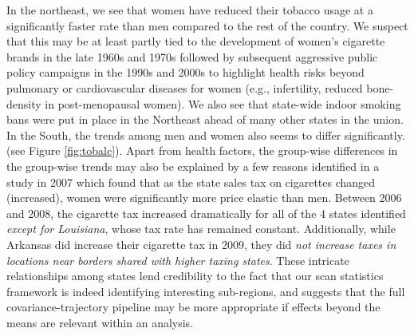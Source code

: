In the northeast, we see that women have reduced their tobacco usage at a significantly faster rate than men compared to the rest of the country. 
We suspect that this may be at least partly tied to the development of women's cigarette brands in the late 1960s and 1970s 
followed by subsequent aggressive public policy campaigns in the 1990s and 2000s to highlight health risks beyond 
pulmonary or cardiovascular diseases for women (e.g., infertility, reduced bone-density in post-menopausal women). We also see that 
state-wide indoor smoking bans were put in place in the Northeast 
ahead of many other states in the union.  
In the South, the trends among men and women also seems to differ significantly. (see Figure \ref{fig:tobalc}). 
Apart from health factors, the group-wise differences in the group-wise trends may also be explained by 
a few reasons identified in a study in 2007 \citep{HEC:HEC1223} which found that as the state sales tax on cigarettes changed (increased), 
women were significantly more price elastic than men. Between 2006 and 2008, the cigarette tax increased dramatically for all of the 4 states identified \textit{except for Louisiana}, whose tax rate has remained constant. Additionally, while Arkansas did increase their cigarette tax in 2009, they did \textit{not increase taxes in locations near borders shared with higher taxing states}. These intricate relationships among states lend credibility to the fact that our scan statistics framework is indeed identifying interesting sub-regions, and suggests that the full covariance-trajectory pipeline may be more appropriate if effects beyond the means are relevant within an analysis. 

%

